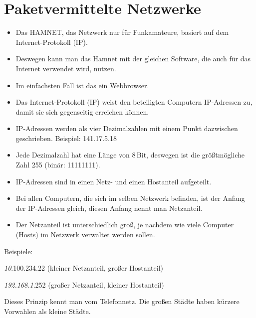
\section{Paketvermittelte Netzwerke}
\label{section:paketvermittelte_netzwerke}
\begin{frame}%
\begin{itemize}
  \item Das HAMNET, das Netzwerk nur für Funkamateure, basiert auf dem Internet-Protokoll (IP).
  \item Deswegen kann man das Hamnet mit der gleichen Software, die auch für das Internet verwendet wird, nutzen.
  \item Im einfachsten Fall ist das ein Webbrowser.
  \end{itemize}
\end{frame}

\begin{frame}\begin{itemize}
  \item Das Internet-Protokoll (IP) weist den beteiligten Computern IP-Adressen zu, damit sie sich gegenseitig erreichen können.
  \item IP-Adressen werden als vier Dezimalzahlen mit einem Punkt dazwischen geschrieben. Beispiel: 141.17.5.18
  \item Jede Dezimalzahl hat eine Länge von 8 Bit, deswegen ist die größtmögliche Zahl 255 (binär: 11111111).
  \end{itemize}

\end{frame}

\begin{frame}\begin{itemize}
  \item IP-Adressen sind in einen Netz- und einen Hostanteil aufgeteilt.
  \item Bei allen Computern, die sich im selben Netzwerk befinden, ist der Anfang der IP-Adressen gleich, diesen Anfang nennt man Netzanteil.
  \item Der Netzanteil ist unterschiedlich groß, je nachdem wie viele Computer (Hosts) im Netzwerk verwaltet werden sollen.
  \end{itemize}
\end{frame}

\begin{frame}Beispiele:

\emph{10}.100.234.22 (kleiner Netzanteil, großer Hostanteil)

\emph{192.168.1}.252 (großer Netzanteil, kleiner Hostanteil)

Dieses Prinzip kennt man vom Telefonnetz. Die großen Städte haben kürzere Vorwahlen als kleine Städte.

\end{frame}

